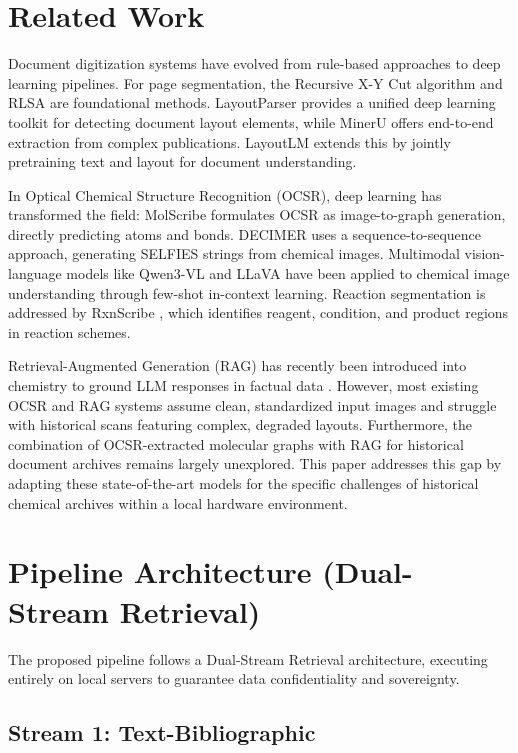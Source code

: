 \documentclass[conference]{IEEEtran}
\begin{document}
\section{Related Work}

Document digitization systems have evolved from rule-based approaches to deep learning pipelines. For page segmentation, the Recursive X-Y Cut algorithm \cite{ref3} and RLSA \cite{ref4} are foundational methods. LayoutParser \cite{ref5} provides a unified deep learning toolkit for detecting document layout elements, while MinerU \cite{ref6} offers end-to-end extraction from complex publications. LayoutLM \cite{ref7} extends this by jointly pretraining text and layout for document understanding.

In Optical Chemical Structure Recognition (OCSR), deep learning has transformed the field: MolScribe \cite{ref8} formulates OCSR as image-to-graph generation, directly predicting atoms and bonds. DECIMER \cite{ref9,ref10} uses a sequence-to-sequence approach, generating SELFIES strings from chemical images. Multimodal vision-language models like Qwen3-VL \cite{ref11} and LLaVA \cite{ref12} have been applied to chemical image understanding through few-shot in-context learning. Reaction segmentation is addressed by RxnScribe \cite{ref13}, which identifies reagent, condition, and product regions in reaction schemes.

Retrieval-Augmented Generation (RAG) has recently been introduced into chemistry to ground LLM responses in factual data \cite{ref14,ref15}. However, most existing OCSR and RAG systems assume clean, standardized input images and struggle with historical scans featuring complex, degraded layouts. Furthermore, the combination of OCSR-extracted molecular graphs with RAG for historical document archives remains largely unexplored. This paper addresses this gap by adapting these state-of-the-art models for the specific challenges of historical chemical archives within a local hardware environment.

\section{Pipeline Architecture (Dual-Stream Retrieval)}

The proposed pipeline follows a Dual-Stream Retrieval architecture, executing entirely on local servers to guarantee data confidentiality and sovereignty.

\subsection{Stream 1: Text-Bibliographic}
\end{document}
